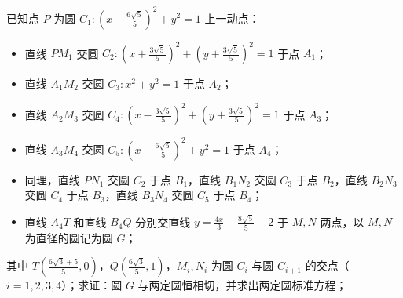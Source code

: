 \begin{example}
已知点 \(P\) 为圆 \(C_1: \left(x + \frac{6\sqrt{5}}{5}\right)^2 + y^2 = 1\) 上一动点：
\begin{itemize}
\item 直线 \(PM_1\) 交圆 \(C_2: \left(x + \frac{3\sqrt{5}}{5}\right)^2 + \left(y + \frac{3\sqrt{5}}{5}\right)^2 = 1\) 于点 \(A_1\)；
\item 直线 \(A_1M_2\) 交圆 \(C_3: x^2 + y^2 = 1\) 于点 \(A_2\)；
\item 直线 \(A_2M_3\) 交圆 \(C_4: \left(x - \frac{3\sqrt{5}}{5}\right)^2 + \left(y + \frac{3\sqrt{5}}{5}\right)^2 = 1\) 于点 \(A_3\)；
\item 直线 \(A_3M_4\) 交圆 \(C_5: \left(x - \frac{6\sqrt{5}}{5}\right)^2 + y^2 = 1\) 于点 \(A_4\)；
\item 同理，直线 \(PN_1\) 交圆 \(C_2\) 于点 \(B_1\)，直线 \(B_1N_2\) 交圆 \(C_3\) 于点 \(B_2\)，直线 \(B_2N_3\) 交圆 \(C_4\) 于点 \(B_3\)，直线 \(B_3N_4\) 交圆 \(C_5\) 于点 \(B_4\)；
\item 直线 \(A_4T\) 和直线 \(B_4Q\) 分别交直线 \(y = \frac{4x}{3} - \frac{8\sqrt{5}}{5} - 2\) 于 \(M,N\) 两点，以 \(M,N\) 为直径的圆记为圆 \(G\)；
\end{itemize}
其中 \(T\left(\frac{6\sqrt{3}+5}{5},0\right)\)，\(Q\left(\frac{6\sqrt{3}}{5},1\right)\)，\(M_i,N_i\) 为圆 \(C_i\) 与圆 \(C_{i+1}\) 的交点（\(i=1,2,3,4\)）；求证：圆 \(G\) 与两定圆恒相切，并求出两定圆标准方程；
\end{example}

